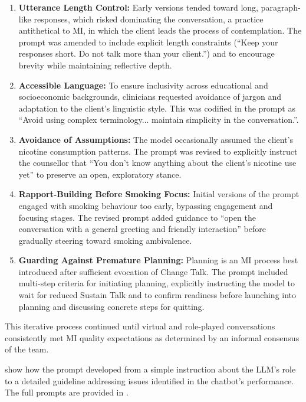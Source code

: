\begin{enumerate}
    \item \textbf{Utterance Length Control:} Early versions tended toward long, paragraph-like responses, which risked dominating the conversation, a practice antithetical to MI, in which the client leads the process of contemplation. The prompt was amended to include explicit length constraints (``Keep your responses short. Do not talk more than your client.'') and to encourage brevity while maintaining reflective depth.

    \item \textbf{Accessible Language:} To ensure inclusivity across educational and socioeconomic backgrounds, clinicians requested avoidance of jargon and adaptation to the client's linguistic style. This was codified in the prompt as ``Avoid using complex terminology... maintain simplicity in the conversation.''.

    \item \textbf{Avoidance of Assumptions:} The model occasionally assumed the client's nicotine consumption patterns. The prompt was revised to explicitly instruct the counsellor that ``You don't know anything about the client's nicotine use yet'' to preserve an open, exploratory stance.

    \item \textbf{Rapport-Building Before Smoking Focus:} Initial versions of the prompt engaged with smoking behaviour too early, bypassing engagement and focusing stages. The revised prompt added guidance to ``open the conversation with a general greeting and friendly interaction'' before gradually steering toward smoking ambivalence.

    \item \textbf{Guarding Against Premature Planning:} Planning is an MI process best introduced after sufficient evocation of Change Talk. The prompt included multi-step criteria for initiating planning, explicitly instructing the model to wait for reduced Sustain Talk and to confirm readiness before launching into planning and discussing concrete steps for quitting.

    
\end{enumerate}



This iterative process continued until virtual and role-played conversations consistently met MI quality expectations as determined by an informal consensus of the team.


 show how the prompt developed from a simple instruction about the LLM's role to a detailed guideline addressing issues identified in the chatbot's performance. The full prompts are provided in .


